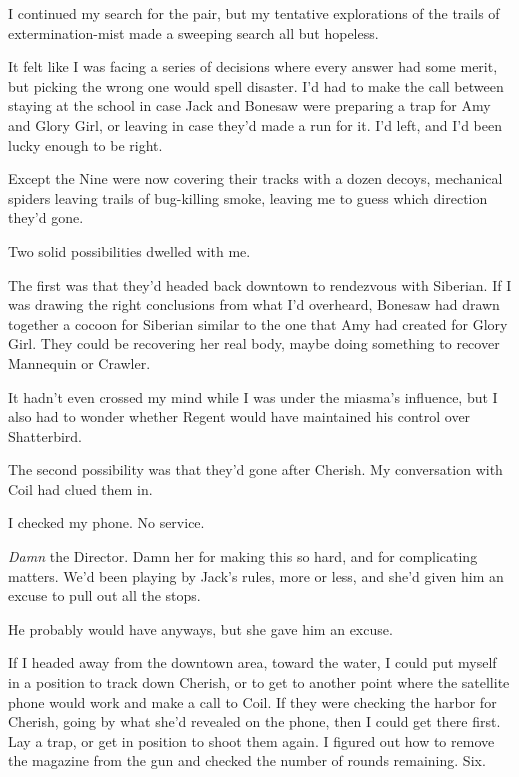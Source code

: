 





I continued my search for the pair, but my tentative explorations of the trails of extermination-mist made a sweeping search all but hopeless.



It felt like I was facing a series of decisions where every answer had some merit, but picking the wrong one would spell disaster.  I'd had to make the call between staying at the school in case Jack and Bonesaw were preparing a trap for Amy and Glory Girl, or leaving in case they'd made a run for it.  I'd left, and I'd been lucky enough to be right.



Except the Nine were now covering their tracks with a dozen decoys, mechanical spiders leaving trails of bug-killing smoke, leaving me to guess which direction they'd gone.



Two solid possibilities dwelled with me.



The first was that they'd headed back downtown to rendezvous with Siberian.  If I was drawing the right conclusions from what I'd overheard, Bonesaw had drawn together a cocoon for Siberian similar to the one that Amy had created for Glory Girl.  They could be recovering her real body, maybe doing something to recover Mannequin or Crawler.



It hadn't even crossed my mind while I was under the miasma's influence, but I also had to wonder whether Regent would have maintained his control over Shatterbird.



The second possibility was that they'd gone after Cherish.  My conversation with Coil had clued them in.



I checked my phone.  No service.



\emph{Damn} the Director.  Damn her for making this so hard, and for complicating matters.  We'd been playing by Jack's rules, more or less, and she'd given him an excuse to pull out all the stops.



He probably would have anyways, but she gave him an excuse.



If I headed away from the downtown area, toward the water, I could put myself in a position to track down Cherish, or to get to another point where the satellite phone would work and make a call to Coil.  If they were checking the harbor for Cherish, going by what she'd revealed on the phone, then I could get there first.  Lay a trap, or get in position to shoot them again.  I figured out how to remove the magazine from the gun and checked the number of rounds remaining.  Six.



